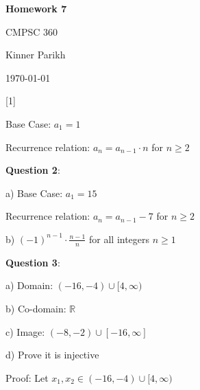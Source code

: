 \documentclass{article} %
\newcommand{\question}[2][]{\begin{flushleft}
        \textbf{Question #1}: #2

\end{flushleft}}
\newcommand{\maketitletwo}[2][]{\begin{center}
        \Large{\textbf{Homework #1}
            
            CMPSC 360} %
        \vspace{5pt}
        
        \normalsize{Kinner Parikh  %
        
        \today}        %
        \vspace{15pt}
        
\end{center}}
\begin{document}
    \maketitletwo[7]  %


                                                               

    \question[1]{}

    Base Case: \tabto*{3.8cm} $a_1 = 1$

    Recurrence relation: $a_n = a_{n - 1} \cdot n$ for $n \geq 2$


    \question[2]{}

    a) Base Case: \tabto*{4.25cm} $a_1 = 15$

    \tabto{0.97cm} Recurrence relation: $a_n = a_{n - 1} - 7$ for $n \geq 2$

    \hspace{0.1cm}

    b) $(-1)^{n - 1}\cdot \frac{n-1}{n}$ for all integers $n \geq 1$

                                                                   
    
    \question[3]{}

    a) Domain: $(-16, -4) \cup [4, \infty)$

    b) Co-domain: $\mathbb{R}$
    
    c) Image: $(-8, -2) \cup [-16, \infty]$

    d) Prove it is injective

    \tabto*{0.98cm} Proof:  Let $x_1, x_2 \in (-16, -4) \cup [4, \infty)$
\end{document}
